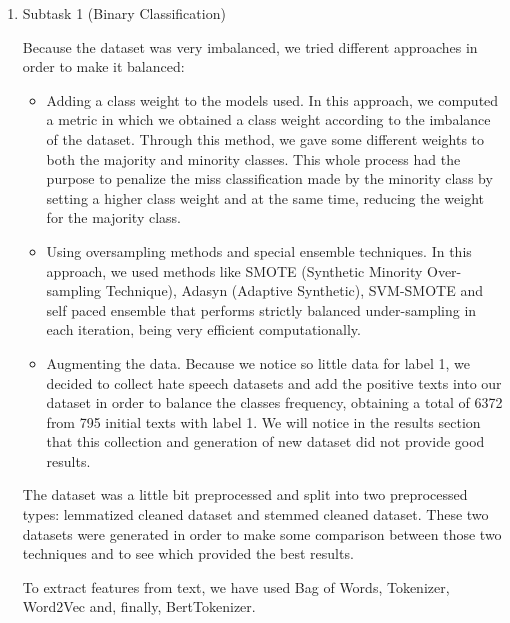 \documentclass[11pt]{article}
\begin{document}
\begin{enumerate}

	\item Subtask 1 (Binary Classification)

	      Because the dataset was very imbalanced, we tried different approaches in
	      order to make it balanced:

	      \begin{itemize}
		      \item Adding a class weight to the models used. In this approach, we
		            computed a metric in which we obtained a class weight according to the
		            imbalance of the dataset. Through this method, we gave some different
		            weights to both the majority and minority classes. This whole process had
		            the purpose to penalize the miss classification made by the minority class by
		            setting a higher class weight and at the same time, reducing the weight for
		            the majority class.

		      \item Using oversampling methods and special ensemble techniques. In this
		            approach, we used methods like SMOTE (Synthetic Minority
		            Over-sampling Technique), Adasyn (Adaptive Synthetic), SVM-SMOTE and self
		            paced ensemble that performs strictly balanced under-sampling in each
		            iteration, being very efficient computationally.

		      \item Augmenting the data. Because we notice so little data for label 1, we
		            decided to collect hate speech datasets and add the positive texts into our
		            dataset in order to balance the classes frequency, obtaining a total of 6372
		            from 795 initial texts with label 1. We will notice in the results section
		            that this collection and generation of new dataset did not provide good
		            results.
	      \end{itemize}

	      The dataset was a little bit preprocessed and split into two preprocessed
	      types: lemmatized cleaned dataset and stemmed cleaned dataset. These two
	      datasets were generated in order to make some comparison between those two
	      techniques and to see which provided the best results.

	      To extract features from text, we have used Bag of
	      Words, Tokenizer, Word2Vec and, finally, BertTokenizer.


\end{enumerate}
\end{document}
